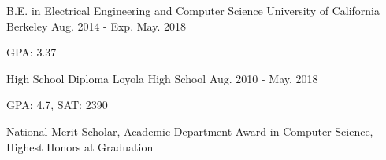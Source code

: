 \vspace{-5mm}
\vspace{-2mm}

\begin{cventries}

  \cventry
    {B.E. in Electrical Engineering and Computer Science} %
    {University of California Berkeley} %
    {Aug. 2014 - Exp. May. 2018} %
    {} %
    {
      \begin{cvitems} %
        \item GPA: 3.37
      \end{cvitems}
    }
      \cventry
    {High School Diploma} %
    {Loyola High School} %
    {Aug. 2010 -  May. 2018} %
    {} %
    {
      \begin{cvitems} %
        \item GPA: 4.7, SAT: 2390
        \item National Merit Scholar, Academic Department Award in Computer Science, Highest Honors at Graduation
      \end{cvitems}
    }

\end{cventries}

